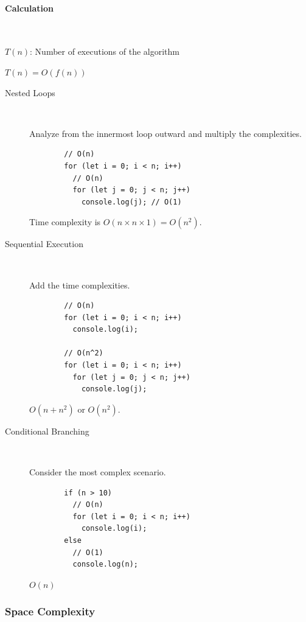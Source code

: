 \documentclass[11pt,journal,compsoc]{IEEEtran}
\begin{document}
\paragraph{Calculation} ~

\(T(n)\): Number of executions of the algorithm

\(T(n) = O(f(n))\)

\begin{description}
    \item[Nested Loops] ~

    Analyze from the innermost loop outward and multiply the complexities.

    \begin{verbatim}
        // O(n)
        for (let i = 0; i < n; i++)
          // O(n)
          for (let j = 0; j < n; j++)
            console.log(j); // O(1)
    \end{verbatim}

    Time complexity is \(O(n \times n \times 1) = O(n^2)\).

    \item[Sequential Execution] ~

    Add the time complexities.

    \begin{verbatim}
        // O(n)
        for (let i = 0; i < n; i++)
          console.log(i);

        // O(n^2)
        for (let i = 0; i < n; i++)
          for (let j = 0; j < n; j++)
            console.log(j);
    \end{verbatim}

     \(O(n + n^2)\) or \(O(n^2)\).

    \item[Conditional Branching] ~

    Consider the most complex scenario.

    \begin{verbatim}
        if (n > 10)
          // O(n)
          for (let i = 0; i < n; i++)
            console.log(i);
        else
          // O(1)
          console.log(n);
    \end{verbatim}

    \(O(n)\)

\end{description}

\subsubsection{Space Complexity}
\end{document}
